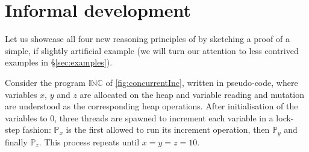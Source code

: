 \section{Informal development}
\label{sec:intuition}

Let us showcase all four new reasoning principles of \colosl by
sketching a proof of a simple, if slightly artificial example (we will
turn our attention to less contrived examples in
\S\ref{sec:examples}).

Consider the program $\mathbb{INC}$ of \fig\ref{fig:concurrentInc},
written in pseudo-code, where variables $x$, $y$ and $z$ are allocated
on the heap and variable reading and mutation are understood as the
corresponding heap operations. After initialisation of the variables
to $0$, three threads are spawned to increment each variable in a
lock-step fashion: $\mathbb{P}_x$ is the first allowed to run its
increment operation, then $\mathbb{P}_y$ and finally
$\mathbb{P}_z$. This process repeats until $x = y = z = 10$.

